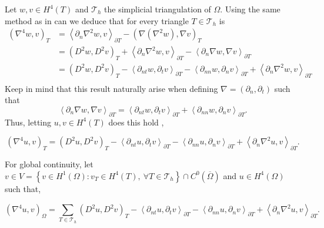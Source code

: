 Let $w,v \in  H^{4} \left( T  \right) $ and $\mathcal{T}_{h} $ the simplicial triangulation of $\Omega$. Using the same method as in \cite{gu2012c0, brenner2012quadratic} can we
deduce that for every triangle $T \in  \mathcal{T}_{h} $ is \[
    \begin{split}
        \left( \nabla ^{4} w, v \right) _{T} &= \left< \partial _{n} \nabla ^2 w, v \right>_{\partial T} - \left( \nabla \left( \nabla ^2 w
 \right), \nabla  v  \right)_{T}   \\
 &= \left( D^2w, D^2v \right)_{T} + \left< \partial _{n} \nabla ^2 w, v \right>_{\partial T}  - \left<\partial _{n}
 \nabla w, \nabla v \right>_{\partial T} \\
 &=  \left( D^2 w, D^2 v \right)_{T} - \left<\partial _{nt} w, \partial _{t} v \right>_{\partial T} - \left<\partial
 _{nn} w, \partial _{n} v \right> _{\partial T} +  \left<\partial _{n} \nabla ^2 w, v \right>_{\partial T} \\
    \end{split}
\]
Keep in mind that this result naturally arise when defining $\nabla  = \left( \partial _{n}, \partial _{t} \right) $ such that
\[
\left<\partial _{n} \nabla w, \nabla v \right>_{\partial T} = \left<\partial _{nt} w, \partial _{t} v\right> _{\partial
T} + \left< \partial _{nn} w, \partial _{n} v  \right> _{\partial T} .
\]
 Thus, letting $u,v \in
H^{4}\left( T  \right) $  does this hold ,

\begin{equation}
\label{eq:bi_basic_dg}
\left( \nabla ^{4} u,v \right) _{T} =  \left( D^2u,D^2v \right) _{T } - \left<\partial _{nt} u, \partial _{t}v
\right>_{\partial T} - \left<\partial _{nn} u, \partial _{n}v \right>_{\partial T} + \left<\partial _{n} \nabla ^2 u,v
\right>_{\partial T}
.\end{equation}

For global continuity, let  $v \in V =  \left\{ v \in H^{1}\left( \Omega  \right): v_{T} \in  H^{4}\left( T \right), \ \forall T \in
\mathcal{T}_{h}    \right\}   \cap C^{0} (
\overline{\Omega }  ) $ and $u \in  H^{4}\left( \Omega  \right) $ such that,

\begin{equation}
\label{eq:bi_basic_dg2}
\left( \nabla ^{4} u,v \right) _{\Omega } = \sum_{T \in  \mathcal{T} _{h}}^{} \left( D^2u,D^2v \right) _{T } - \left<\partial _{nt} u, \partial _{t}v
\right>_{\partial T} - \left<\partial _{nn} u, \partial _{n}v \right>_{\partial T} + \left<\partial _{n} \nabla ^2 u,v
\right>_{\partial T}
.\end{equation}

